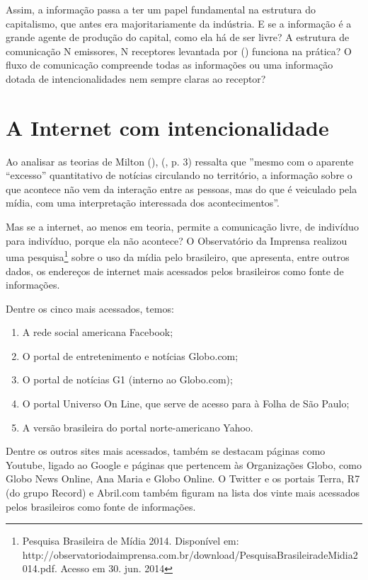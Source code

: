 \documentclass[
	article,			%
	12pt,				%
	oneside,			%
	a4paper,			%
	english,			%
	brazil,				%
	]{abntex2}
\begin{document}
Assim, a informação passa a ter um papel fundamental na estrutura do capitalismo, que antes era majoritariamente da indústria. E se a informação é a grande agente de produção do capital, como ela há de ser livre? A estrutura de comunicação N emissores, N receptores levantada por  (\citeyear{levy1998}) funciona na prática? O fluxo de comunicação compreende todas as informações ou uma informação dotada de intencionalidades nem sempre claras ao receptor?

\section*{A Internet com intencionalidade}

Ao analisar as teorias de Milton  (\citeyear{santos2001}),  (\citeyear{pasti2013}, p. 3) ressalta que ''mesmo com o aparente “excesso” quantitativo de notícias circulando no território, a informação sobre o que acontece não vem da interação entre as pessoas, mas do que é veiculado pela mídia, com uma interpretação interessada dos acontecimentos''.

Mas se a internet, ao menos em teoria, permite a comunicação livre, de indivíduo para indivíduo, porque ela não acontece? O Observatório da Imprensa realizou uma pesquisa\footnote{Pesquisa Brasileira de Mídia 2014. Disponível em: http://observatoriodaimprensa.com.br/download/PesquisaBrasileiradeMidia2014.pdf. Acesso em 30. jun. 2014} sobre o uso da mídia pelo brasileiro, que apresenta, entre outros dados, os endereços de internet mais acessados pelos brasileiros como fonte de informações.

Dentre os cinco mais acessados, temos: 

\begin{enumerate}
\item A rede social americana Facebook;
\item O portal de entretenimento e notícias Globo.com;
\item O portal de notícias G1 (interno ao Globo.com);
\item O portal Universo On Line, que serve de acesso para à Folha de São Paulo;
\item A versão brasileira do portal norte-americano Yahoo.
\end{enumerate}

Dentre os outros sites mais acessados, também se destacam páginas como Youtube, ligado ao Google e páginas que pertencem às Organizações Globo, como Globo News Online, Ana Maria e Globo Online. O Twitter e os portais Terra, R7 (do grupo Record) e Abril.com também figuram na lista dos vinte mais acessados pelos brasileiros como fonte de informações.
\end{document}
